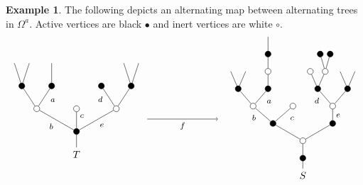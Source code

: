 \documentclass[a4paper,10pt
,draft
]{article}%
\numberwithin{equation}{section}
\numberwithin{figure}{section}
\theoremstyle{definition} %
\newtheorem{example}[equation]{Example}%
\newcommand{\1}{\ensuremath{\mathbbm 1}}%
\begin{document}
\begin{example}\label{ALTMAP EX}
	The following depicts an alternating map between alternating trees
	in $\Omega^a$.
	Active vertices are black $\bullet$ and inert vertices are white $\circ$.
	\[
	\begin{tikzpicture}[grow=up,auto,level distance=2.3em,every node/.style = {font=\footnotesize},dummy/.style={circle,draw,inner sep=0pt,minimum size=2.1mm}]
	\tikzstyle{level 2}=[sibling distance = 4em]
	\tikzstyle{level 3}=[sibling distance = 3em]
	\tikzstyle{level 4}=[sibling distance = 1.5em]
	\node at (0,0.75) [font = \normalsize] {$T$}
	child{node [dummy,fill = black] {}
		child{node [dummy,fill=white] {}
			child{node [dummy,fill = black] {}
				child
				child
			}
			child{node [dummy,fill = black] {}
				edge from parent node [near end] {$d$}}
			edge from parent node [swap] {$e$}}
		child{node [dummy,fill=white] {}
			edge from parent node [swap, near end] {$c$}}
		child{node [dummy,fill=white] {}
			child{node [dummy,fill = black] {}
				child
				edge from parent node [swap, near end] {$a\phantom{d}$}}
			child{node [dummy,fill = black] {}
				child
				child
			}
			edge from parent node {$b$}}
	};
	\begin{scope}[level distance=1.75em]
	\tikzstyle{level 3}=[sibling distance = 6em]
	\tikzstyle{level 4}=[sibling distance = 4em]
	\tikzstyle{level 5}=[sibling distance = 3em]
	\tikzstyle{level 6}=[sibling distance = 1.5em]
	\tikzstyle{level 7}=[sibling distance = 1em]
	\node at (8,0) [font = \normalsize] {$S$}
	child{node [dummy,fill = black] {}
		child{node [dummy,fill = white] {}
			child{node [dummy,fill = black] {}
				child{node [dummy,fill=white] {}
					child{node [dummy,fill = black] {}
						child
						child
					}
					child{node [dummy,fill = black] {}
						child{node [dummy,fill=white] {}
							child{node [dummy,fill = black] {}}
							child{node [dummy,fill = black] {}}
						}
						child{node [dummy,fill=white] {}}
						edge from parent node [near end] {$d$}}
					edge from parent node [swap] {$e\phantom{1}$}}
			}
			child{node [dummy,fill = black] {}
				child{node [dummy,fill=white] {}
					edge from parent node [swap, near end] {$c\phantom{1}$}}
				child{node [dummy,fill=white] {}
					child{node [dummy,fill = black] {}
						child{node [dummy,fill=white] {}
							child{node [dummy,fill = black] {}
								child
							}
						}
						edge from parent node [swap,near end] {$a\phantom{d}$}}
					child{node [dummy,fill = black] {}
						child
						child
					}
					edge from parent node [near end] {$\phantom{1}b$}}
			}
		}
	};
	\end{scope}
	\draw [->] (2.5,2) -- node [swap] {$f$} (5,2);
	\end{tikzpicture}
	\]
\end{example}
\end{document}

